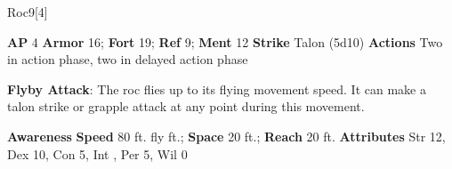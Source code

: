 \begin{monsection}{Roc}{9}[4]
\vspace{-1em}\vspace{-1em}
\begin{spellcontent}
\begin{spelltargetinginfo}
{\textbf{AP} 4}
\pari \textbf{Armor} 16;
\textbf{Fort} 19;
\textbf{Ref} 9;
\textbf{Ment} 12
\pari \textbf{Strike} Talon  (5d10)
\pari \textbf{Actions} Two in action phase, two in delayed action phase
\end{spelltargetinginfo}
\begin{spelleffects}
\pari
\textbf{Flyby Attack}:
The roc flies up to its flying movement speed.
It can make a talon strike or grapple attack at any point during this movement.
\end{spelleffects}
\end{spellcontent}
\begin{spellsubcontent}
\begin{spellfooter}
\pari \textbf{Awareness} 
\pari \textbf{Speed} 80 ft. fly ft.;
\textbf{Space} 20 ft.;
\textbf{Reach} 20 ft.
\pari \textbf{Attributes}
Str 12,
Dex 10,
Con 5,
Int ,
Per 5,
Wil 0
\end{spellfooter}
\end{spellsubcontent}
\end{monsection}

